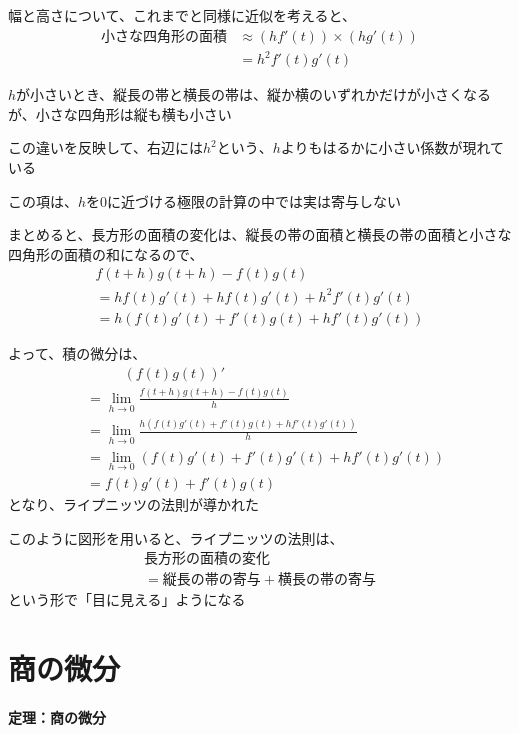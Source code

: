 \documentclass[../book_jiriki_calc]{subfiles}
\begin{document}
幅と高さについて、これまでと同様に近似を考えると、
\begin{align}
  \text{小さな四角形の面積} & \approx (hf'(t))\times (hg'(t)) \\
                   & = h^2f'(t)g'(t)
\end{align}

$h$が小さいとき、縦長の帯と横長の帯は、縦か横のいずれかだけが小さくなるが、小さな四角形は縦も横も小さい

この違いを反映して、右辺には$h^2$という、$h$よりもはるかに小さい係数が現れている

この項は、$h$を$0$に近づける極限の計算の中では実は寄与しない

\sectionline

まとめると、長方形の面積の変化は、縦長の帯の面積と横長の帯の面積と小さな四角形の面積の和になるので、
\begin{multline}
  f(t+h)g(t+h) - f(t)g(t) \\ = hf(t)g'(t) + hf(t)g'(t) + h^2f'(t)g'(t)
  \\ = h\left( f(t)g'(t) + f'(t)g(t) + hf'(t)g'(t)\right)
\end{multline}

よって、積の微分は、
\begin{align}
   & \phantom{==} (f(t)g(t))'                                                      \\
   & = \lim_{h \to 0} \frac{f(t+h)g(t+h) - f(t)g(t)}{h}                            \\
   & = \lim_{h \to 0} \frac{h\left( f(t)g'(t) + f'(t)g(t) + hf'(t)g'(t)\right)}{h} \\
   & = \lim_{h \to 0} \left( f(t)g'(t) + f'(t)g'(t)+ hf'(t)g'(t)\right)            \\
   & = f(t)g'(t) + f'(t)g(t)
\end{align}
となり、ライプニッツの法則が導かれた

\sectionline

このように図形を用いると、ライプニッツの法則は、
\begin{multline}
  \text{長方形の面積の変化} \\ = \text{縦長の帯の寄与} + \text{横長の帯の寄与}
\end{multline}
という形で「目に見える」ようになる

\section{商の微分}

\paragraph{定理：商の微分}\quad
\end{document}
